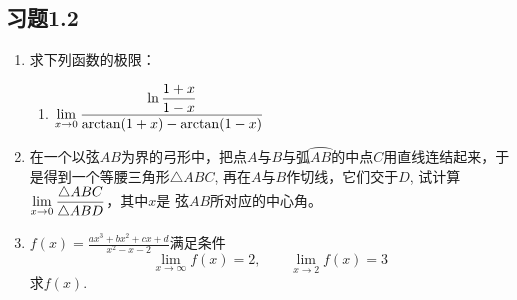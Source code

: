 \subsection*{习题1.2}
\begin{enumerate}
    \item 求下列函数的极限：
\begin{enumerate}   
    \item $\displaystyle\lim_{x\to 0}\dfrac{\ln\dfrac{1+x}{1-x}}{\arctan(1+x)-\arctan(1-x)}$
\end{enumerate} 

\item 在一个以弦$AB$为界的弓形中，把点$A$与$B$与弧$\wideparen{AB}$的中点$C$用直线连结起来，于是得到一个等腰三角形$\triangle  ABC$, 再在$A$与$B$作切线，它们交于$D$, 试计算$\displaystyle\lim_{x\to 0}\dfrac{\triangle ABC}{\triangle ABD}$，其中$x$是
弦$AB$所对应的中心角。

\item $f(x)=\frac{ax^3+bx^2+cx+d}{x^2-x-2}$满足条件
\[\lim_{x\to \infty} f(x)=2,\qquad \lim_{x\to 2} f(x)=3\]
求$f(x)$.
\end{enumerate}

